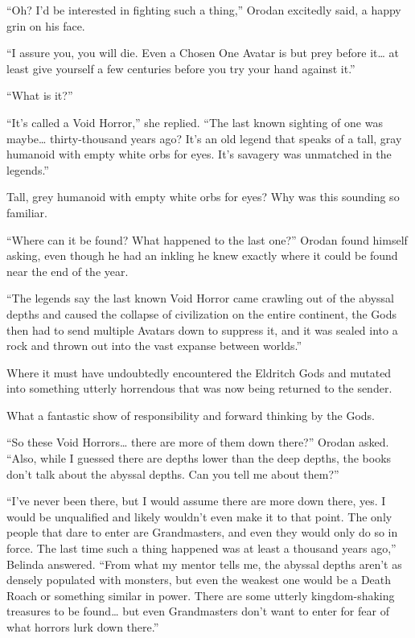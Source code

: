 \documentclass[a4paper,10pt]{book}
\begin{document}
“Oh? I’d be interested in fighting such a thing,” Orodan excitedly said, a happy grin on his face.\par
“I assure you, you will die. Even a Chosen One Avatar is but prey before it… at least give yourself a few centuries before you try your hand against it.”\par
“What is it?”\par
“It’s called a Void Horror,” she replied. “The last known sighting of one was maybe… thirty-thousand years ago? It’s an old legend that speaks of a tall, gray humanoid with empty white orbs for eyes. It’s savagery was unmatched in the legends.”\par
Tall, grey humanoid with empty white orbs for eyes? Why was this sounding so familiar.\par
“Where can it be found? What happened to the last one?” Orodan found himself asking, even though he had an inkling he knew exactly where it could be found near the end of the year.\par
“The legends say the last known Void Horror came crawling out of the abyssal depths and caused the collapse of civilization on the entire continent, the Gods then had to send multiple Avatars down to suppress it, and it was sealed into a rock and thrown out into the vast expanse between worlds.”\par
Where it must have undoubtedly encountered the Eldritch Gods and mutated into something utterly horrendous that was now being returned to the sender.\par
What a fantastic show of responsibility and forward thinking by the Gods.\par
“So these Void Horrors… there are more of them down there?” Orodan asked. “Also, while I guessed there are depths lower than the deep depths, the books don’t talk about the abyssal depths. Can you tell me about them?”\par
“I’ve never been there, but I would assume there are more down there, yes. I would be unqualified and likely wouldn’t even make it to that point. The only people that dare to enter are Grandmasters, and even they would only do so in force. The last time such a thing happened was at least a thousand years ago,” Belinda answered. “From what my mentor tells me, the abyssal depths aren’t as densely populated with monsters, but even the weakest one would be a Death Roach or something similar in power. There are some utterly kingdom-shaking treasures to be found… but even Grandmasters don’t want to enter for fear of what horrors lurk down there.”\par
\end{document}
